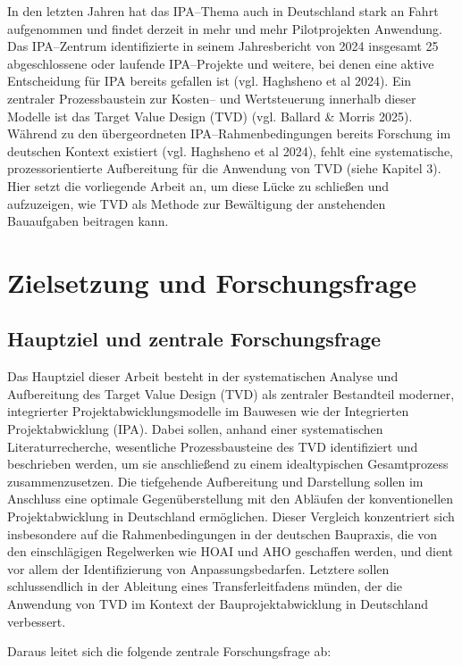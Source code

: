 In den letzten Jahren hat das IPA--Thema auch in Deutschland stark an Fahrt aufgenommen und findet derzeit in mehr und mehr Pilotprojekten Anwendung. Das IPA--Zentrum identifizierte in seinem Jahresbericht von 2024 insgesamt 25 abgeschlossene oder laufende IPA--Projekte und weitere, bei denen eine aktive Entscheidung für IPA bereits gefallen ist (vgl. Haghsheno et al 2024). Ein zentraler Prozessbaustein zur Kosten-- und Wertsteuerung innerhalb dieser Modelle ist das Target Value Design (TVD) (vgl. Ballard \& Morris 2025). Während zu den übergeordneten IPA--Rahmenbedingungen bereits Forschung im deutschen Kontext existiert (vgl. Haghsheno et al 2024), fehlt eine systematische, prozessorientierte  Aufbereitung für die Anwendung von TVD (siehe Kapitel 3). Hier setzt die vorliegende  Arbeit an, um diese Lücke zu schließen und aufzuzeigen, wie TVD als Methode zur Bewältigung der anstehenden Bauaufgaben beitragen kann.

\section{Zielsetzung und Forschungsfrage}
\label{sec:zielsetzung}

\subsection{Hauptziel und zentrale Forschungsfrage}
Das Hauptziel dieser Arbeit besteht in der systematischen Analyse und Aufbereitung des Target Value Design (TVD) als zentraler Bestandteil moderner, integrierter Projektabwicklungsmodelle im Bauwesen wie der Integrierten Projektabwicklung (IPA). Dabei sollen, anhand einer systematischen Literaturrecherche, wesentliche Prozessbausteine des TVD identifiziert und beschrieben werden, um sie anschließend zu einem idealtypischen Gesamtprozess zusammenzusetzen. Die tiefgehende Aufbereitung und Darstellung sollen im Anschluss eine optimale Gegenüberstellung mit den Abläufen der konventionellen Projektabwicklung in Deutschland ermöglichen. Dieser Vergleich konzentriert sich insbesondere auf die Rahmenbedingungen in der deutschen Baupraxis, die von den einschlägigen Regelwerken wie HOAI und AHO geschaffen werden, und dient vor allem der Identifizierung von Anpassungsbedarfen. Letztere sollen schlussendlich in der Ableitung eines Transferleitfadens münden, der die Anwendung von TVD im Kontext der Bauprojektabwicklung in Deutschland verbessert.

Daraus leitet sich die folgende zentrale Forschungsfrage ab:

